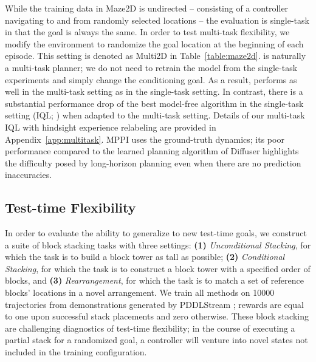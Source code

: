 While the training data in Maze2D is undirected -- consisting of a controller navigating to and from randomly selected locations -- the evaluation is single-task in that the goal is always the same.
In order to test multi-task flexibility, we modify the environment to randomize the goal location at the beginning of each episode.
This setting is denoted as Multi2D in Table~\ref{table:maze2d}.
\method{} is naturally a multi-task planner; we do not need to retrain the model from the single-task experiments and simply change the conditioning goal.
As a result, \method{} performs as well in the multi-task setting as in the single-task setting.
In contrast, there is a substantial performance drop of the best model-free algorithm in the single-task setting (IQL; \citealt{kostrikov2021implicit}) when adapted to the multi-task setting.
Details of our multi-task IQL with hindsight experience relabeling \citep{andrychowicz2017hindsight} are provided in Appendix~\ref{app:multitask}.
MPPI uses the ground-truth dynamics; its poor performance compared to the learned planning algorithm of Diffuser highlights the difficulty posed by long-horizon planning even when there are no prediction inaccuracies.





\vspace{-.2cm}
\subsection{Test-time Flexibility}
\label{sec:blocks}

In order to evaluate the ability to generalize to new test-time goals, we construct a suite of block stacking tasks with three settings: \textbf{(1)} {\it Unconditional Stacking}, for which the task is to build a block tower as tall as possible; \textbf{(2)} {\it Conditional Stacking}, for which the task is to construct a block tower with a specified order of blocks, and \textbf{(3)} {\it Rearrangement}, for which the task is to match a set of reference blocks' locations in a novel arrangement.
We train all methods on 10000 trajectories from demonstrations generated by PDDLStream \citep{garrett2020pddlstream}; rewards are equal to one upon successful stack placements and zero otherwise.
These block stacking are challenging diagnostics of test-time flexibility;
in the course of executing a partial stack for a randomized goal, a controller will venture into novel states not included in the training configuration.

